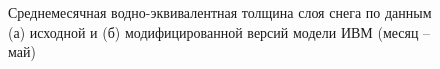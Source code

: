 \documentclass[a4paper, fontsize=12pt]{scrartcl}
\begin{document}
\begin{figure}[h]
    \begin{minipage}[h]{0.49\linewidth}
    \end{minipage}
    \hfill
    \begin{minipage}[h]{0.49\linewidth}
    \end{minipage}
    \caption{Среднемесячная водно-эквивалентная толщина слоя снега по данным (а) исходной и (б) модифицированной версий модели ИВМ (месяц -- май) }
    \label{fig:image}
\end{figure}
\end{document}
